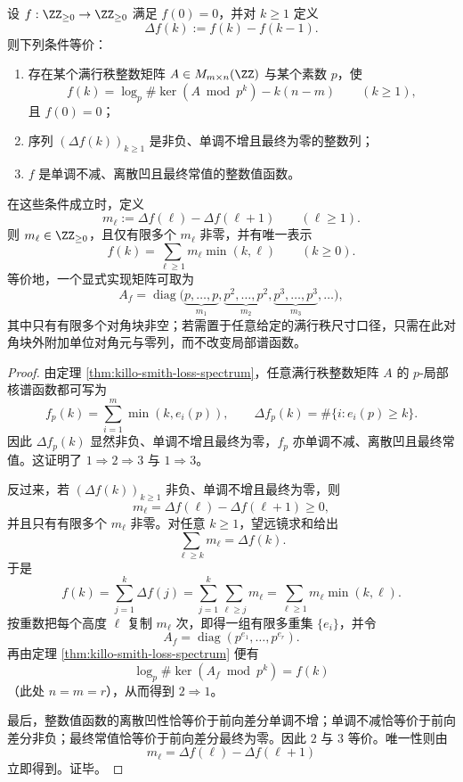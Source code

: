 \begin{theorem}\label{thm:conclusion-smith-p-kernel-spectrum-discrete-concave-characterization}
设 \(f:\ZZ_{\ge 0}\to \ZZ_{\ge 0}\) 满足 \(f(0)=0\)，并对 \(k\ge 1\) 定义
\[
\Delta f(k):=f(k)-f(k-1).
\]
则下列条件等价：
\begin{enumerate}
  \item 存在某个满行秩整数矩阵 \(A\in M_{m\times n}(\ZZ)\) 与某个素数 \(p\)，使
  \[
  f(k)=\log_p\#\ker(A\bmod p^k)-k(n-m)
  \qquad(k\ge 1),
  \]
  且 \(f(0)=0\)；
  \item 序列 \((\Delta f(k))_{k\ge 1}\) 是非负、单调不增且最终为零的整数列；
  \item \(f\) 是单调不减、离散凹且最终常值的整数值函数。
\end{enumerate}
在这些条件成立时，定义
\[
m_\ell:=\Delta f(\ell)-\Delta f(\ell+1)
\qquad(\ell\ge 1).
\]
则 \(m_\ell\in \ZZ_{\ge 0}\)，且仅有限多个 \(m_\ell\) 非零，并有唯一表示
\[
f(k)=\sum_{\ell\ge 1}m_\ell\min(k,\ell)
\qquad(k\ge 0).
\]
等价地，一个显式实现矩阵可取为
\[
A_f=
\operatorname{diag}\bigl(
\underbrace{p,\dots,p}_{m_1},
\underbrace{p^2,\dots,p^2}_{m_2},
\underbrace{p^3,\dots,p^3}_{m_3},
\dots
\bigr),
\]
其中只有有限多个对角块非空；若需置于任意给定的满行秩尺寸口径，只需在此对角块外附加单位对角元与零列，而不改变局部谱函数。
\end{theorem}
\begin{proof}
由定理 \ref{thm:killo-smith-loss-spectrum}，任意满行秩整数矩阵 \(A\) 的 \(p\)-局部核谱函数都可写为
\[
f_p(k)=\sum_{i=1}^{m}\min(k,e_i(p)),
\qquad
\Delta f_p(k)=\#\{i:e_i(p)\ge k\}.
\]
因此 \(\Delta f_p(k)\) 显然非负、单调不增且最终为零，\(f_p\) 亦单调不减、离散凹且最终常值。这证明了 \(1\Rightarrow 2\Rightarrow 3\) 与 \(1\Rightarrow 3\)。

反过来，若 \((\Delta f(k))_{k\ge 1}\) 非负、单调不增且最终为零，则
\[
m_\ell=\Delta f(\ell)-\Delta f(\ell+1)\ge 0,
\]
并且只有有限多个 \(m_\ell\) 非零。对任意 \(k\ge 1\)，望远镜求和给出
\[
\sum_{\ell\ge k}m_\ell=\Delta f(k).
\]
于是
\[
f(k)
=
\sum_{j=1}^{k}\Delta f(j)
=
\sum_{j=1}^{k}\sum_{\ell\ge j}m_\ell
=
\sum_{\ell\ge 1}m_\ell\min(k,\ell).
\]
按重数把每个高度 \(\ell\) 复制 \(m_\ell\) 次，即得一组有限多重集 \(\{e_i\}\)，并令
\[
A_f=\operatorname{diag}(p^{e_1},\dots,p^{e_r}).
\]
再由定理 \ref{thm:killo-smith-loss-spectrum} 便有
\[
\log_p\#\ker(A_f\bmod p^k)=f(k)
\]
（此处 \(n=m=r\)），从而得到 \(2\Rightarrow 1\)。

最后，整数值函数的离散凹性恰等价于前向差分单调不增；单调不减恰等价于前向差分非负；最终常值恰等价于前向差分最终为零。因此 \(2\) 与 \(3\) 等价。唯一性则由
\[
m_\ell=\Delta f(\ell)-\Delta f(\ell+1)
\]
立即得到。证毕。
\end{proof}

